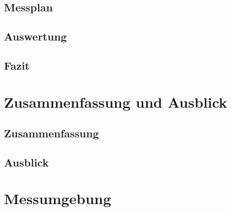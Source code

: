 \documentclass[a4paper, 11pt, toc=bibliography, toc=listof]{scrbook}
\begin{document}

		\section{Messplan} %
		\label{sec:Messplan}
			

		\section{Auswertung} %
		\label{sec:Auswertung}
			

		\section{Fazit} %
		\label{sec:Fazit}
		


	\chapter{Zusammenfassung und Ausblick} %
	\label{cha:Zusammenfassung}

		\section{Zusammenfassung} %
		\label{sec:Zusammenfassung}
			

		\section{Ausblick} %
		\label{sec:Ausblick}
		
	


	\appendix

	\chapter{Messumgebung} %
	\label{cha:Messumgebung}



	\backmatter

	\listoffigures{}
	\listoftables{}

	\nocite{*}
	
	

\end{document}
